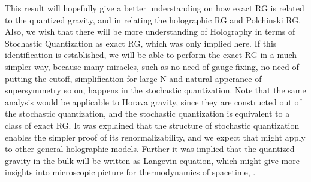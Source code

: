 \documentclass[12pt,epsbox]{article}
\numberwithin{equation}{section}
\begin{document}
This result will hopefully give a better understanding on how exact RG is related to the quantized gravity, and in relating the holographic RG and Polchinski RG. Also, we wish that there will be more understanding of Holography in terms of Stochastic Quantization as exact RG, which was only implied here.
If this identification is established, we will be able to perform the exact RG in a much simpler way, because many miracles, such as no need of gauge-fixing, no need of putting the cutoff, simplification for large N and natural apperance of supersymmetry so on, happens in the stochastic quantization. Note that the same analysis would be applicable to Horava gravity, since they are constructed out of the stochastic quantization, and the stochastic quantization is equivalent to a class of exact RG. It was explained that the structure of stochastic quantization enables the simpler proof of its renormalizability\cite{Susanne}, and we expect that might apply to other general holographic models. Further it was implied that the quantized gravity in the bulk will be written as Langevin equation, which might give more insights into microscopic picture for thermodynamics of spacetime\cite{Jacobson}, \cite{Entropic}.
\end{document}
